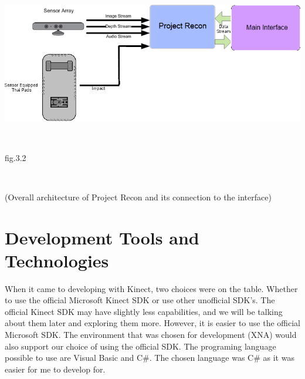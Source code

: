 \documentclass[11pt]{article} %
\begin{document}
\\
\\
\centerline{\includegraphics[scale=0.8]{general_overview.png}}
\\
\centerline{fig.3.2}
\\
\centerline{(Overall architecture of Project Recon and its connection to the interface)}
\section{Development Tools and Technologies}
When it came to developing with Kinect, two choices were on the table. Whether to use the official Microsoft Kinect SDK or use other unofficial SDK's. The official Kinect SDK may have slightly less capabilities, and we will be talking about them later and exploring them more. However, it is easier to use the official Microsoft SDK. The environment that was chosen for development (XNA) would also support our choice of using the official SDK. The programing language possible to use are Visual Basic and C\#. The chosen language was C\# as it was easier for me to develop for.
\end{document}
